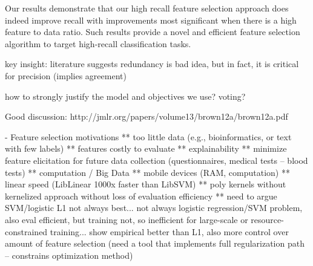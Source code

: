 Our results demonstrate that our high recall feature selection
approach does indeed improve recall with improvements most significant when 
there is a high feature to data ratio.  Such results provide a novel
and efficient feature selection algorithm to target high-recall
classification tasks.

\COMMENT











key insight: literature suggests redundancy is bad idea, but in fact, it is critical for precision (implies agreement)

how to strongly justify the model and objectives we use?  voting?

Good discussion: http://jmlr.org/papers/volume13/brown12a/brown12a.pdf

- Feature selection motivations
** too little data (e.g., bioinformatics, or text with few labels)
** features costly to evaluate
** explainability
** minimize feature elicitation for future data collection (questionnaires, medical tests -- blood tests)
** computation / Big Data
** mobile devices (RAM, computation)
** linear speed (LibLinear 1000x faster than LibSVM)
** poly kernels without kernelized approach without loss of evaluation efficiency
** need to argue SVM/logistic L1 not always best... not always logistic regression/SVM problem, also eval efficient, but training not, so 
inefficient for large-scale or resource-constrained training... show empirical better than L1, also more control over amount of feature 
selection (need a tool that implements full regularization path -- constrains optimization method)


